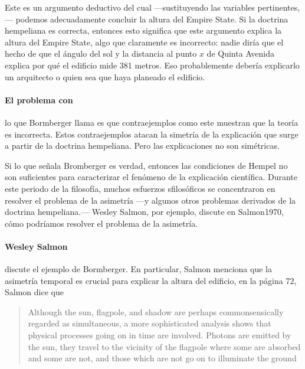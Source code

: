 Este es un argumento deductivo del cual ---sustituyendo las
variables pertinentes,--- podemos adecuadamente concluir la altura
del Empire State. Si la doctrina hempeliana es correcta, entonces
esto significa que este argumento explica la altura del Empire
State, algo que claramente es incorrecto: nadie diría que el hecho
de que el ángulo del sol y la distancia al punto $x$ de Quinta
Avenida explica por qué el edificio mide 381 metros. Eso
probablemente debería explicarlo un arquitecto o quien sea que haya
planeado el edificio.

\paragraph{El problema con} lo que Bormberger llama  es que contraejemplos como este muestran que la teoría
es incorrecta. Estos contraejemplos atacan la simetría de la
explicación que surge a partir de la doctrina hempeliana. Pero las
explicaciones no son simétricas.

Si lo que señala Bromberger es verdad, entonces las condiciones de
Hempel no son suficientes para caracterizar el fenómeno de la
explicación científica. Durante este periodo de la filosofía, muchos
esfuerzos sfilosóficos se concentraron en resolver el problema de la
asimetría ---y algunos otros problemas derivados de la doctrina
hempeliana.--- Wesley Salmon, por ejemplo, discute en \citetitle
{Salmon1970}, cómo podríamos resolver el problema de la asimetría.

\paragraph{Wesley Salmon} discute el ejemplo de Bormberger. En
particular, Salmon menciona que la asimetría temporal es crucial
para explicar la altura del edificio, en la página 72, Salmon dice
que

\begin{quote}
	Although the sun, flagpole, and shadow are perhaps
	commonsensically regarded as simultaneous, a more sophisticated
	analysis shows that physical processes going on in time are
	involved. Photons are emitted by the sun, they travel to the
	vicinity of the flagpole where some are absorbed and some are
	not, and those which are not go on to illuminate the ground
\end{quote}

